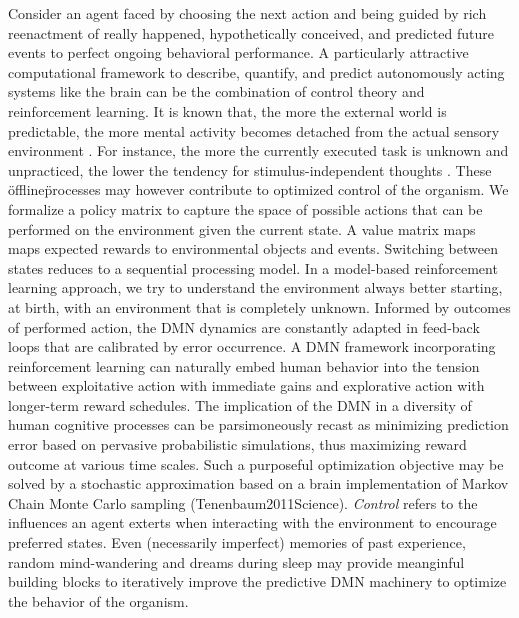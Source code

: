 \documentclass{article} %
\begin{document}
Consider an agent faced by choosing the next action
and being guided by rich
reenactment of really happened, hypothetically conceived, and
predicted future events to perfect ongoing behavioral performance.
A particularly attractive computational framework
to describe, quantify, and predict autonomously acting systems like the brain
can be the combination of control theory and reinforcement learning.
It is known that, the more the external world is predictable,
the more mental activity becomes detached from the actual sensory environment
\cite{antrobus1966studies, pope1978regulation}.
For instance,
the more the currently executed task is unknown and unpracticed,
the lower the tendency for stimulus-independent thoughts
\cite{filler1973daydreaming, teasdale1995stimulus}.
These \"offline\" processes may however contribute to optimized control of the organism.
We formalize
a policy matrix to capture the space of possible actions that can be performed
on the environment given the current state. A value matrix 
maps maps expected rewards to environmental objects and events.
Switching between states reduces to a sequential processing model.
In a model-based reinforcement learning approach,
we try to understand the environment always better
starting, at birth, with an environment that is completely unknown.
Informed by outcomes of performed action,
the DMN dynamics are constantly adapted in feed-back loops
that are calibrated by error occurrence.
A DMN framework incorporating reinforcement learning
can naturally embed human behavior
into the tension between exploitative action with immediate gains and
explorative action with longer-term reward schedules.
The implication of the DMN in a diversity of human cognitive processes
can be parsimoneously recast as minimizing prediction error
based on pervasive probabilistic simulations,
thus maximizing reward outcome at various time scales.
Such a purposeful optimization objective
may be solved by a stochastic approximation
based on a brain implementation of Markov Chain Monte Carlo sampling
(Tenenbaum2011Science).
\textit{Control} refers to the influences an agent exterts when interacting
with the environment to encourage preferred states.
Even (necessarily imperfect) memories
of past experience, random mind-wandering and dreams during sleep
may provide meanginful building blocks to iteratively improve
the predictive DMN machinery to optimize the behavior of the organism.
\end{document}
